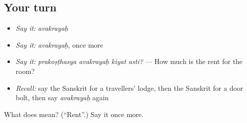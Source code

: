 \subsection*{Your turn}
\begin{itemize}
\raggedright
  \item \emph{Say it:} \emph{avakrayaḥ}
  \item \emph{Say it:} \emph{avakrayaḥ}, once more
  \item \emph{Say it:} \emph{prakoṣṭhasya avakrayaḥ kiyat asti?} — How much is the rent for the room?
  \item \emph{Recall:} say the Sanskrit for a travellers' lodge, then the Sanskrit for a door bolt, then say \emph{avakrayaḥ} again
\end{itemize}

\begin{tcolorbox}[breakable,colback=teal!4,colframe=teal!35!black,title={Before you move on}]
What does  mean? (\textquotedblleft{}Rent\textquotedblright{}.) Say it once more.
\end{tcolorbox}
